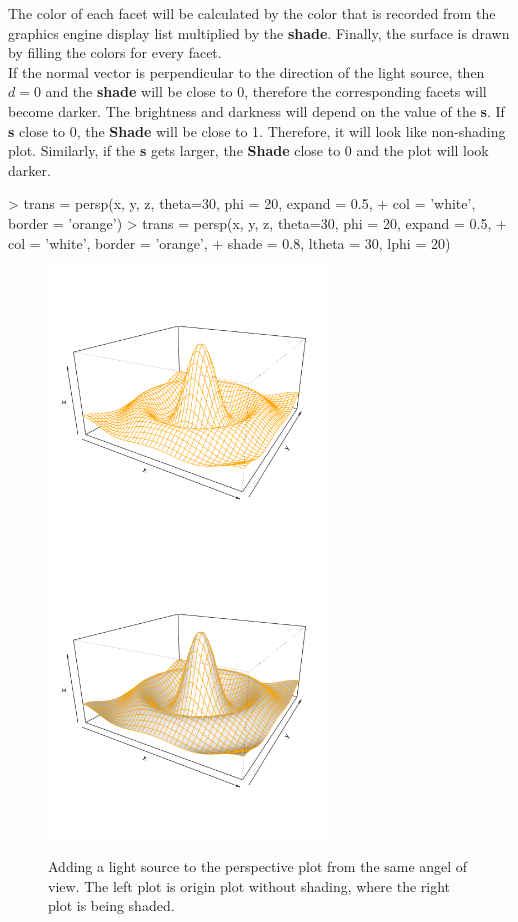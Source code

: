\documentclass[11pt]{report}
\begin{document}
The color of each facet will be calculated by the color that is recorded from the graphics engine display list multiplied by the \textbf{shade}. Finally, the surface is drawn by filling the colors for every facet.\\

If the normal vector is perpendicular to the direction of the light source, then $d = 0$ and the \textbf{shade} will be close to 0, therefore the corresponding facets will become darker. The brightness and darkness will depend on the value of the \textbf{s}. If \textbf{s} close to 0, the \textbf{Shade} will be close to 1. Therefore, it will look like non-shading plot. Similarly, if the \textbf{s} gets larger, the \textbf{Shade} close to 0 and the plot will look darker.

\begin{Schunk}
\begin{Sinput}
> trans = persp(x, y, z, theta=30, phi = 20, expand = 0.5,
+               col = 'white', border = 'orange')
> trans = persp(x, y, z, theta=30, phi = 20, expand = 0.5,
+               col = 'white', border = 'orange', 
+               shade = 0.8, ltheta = 30, lphi = 20)
\end{Sinput}
\end{Schunk}


\begin{figure}[h]
	\begin{center}
		\includegraphics[height = 7.5cm, width = 7.5cm]{figure/Lighting_1.pdf}
		\includegraphics[height = 7.5cm, width = 7.5cm]{figure/Lighting_2.pdf}
		\caption{Adding a light source to the perspective plot from the same angel of view. The left plot is origin plot without shading, where the right plot is being shaded.}
		\label{figure_3.3}
	\end{center}
\end{figure}
\end{document}
